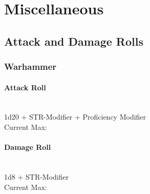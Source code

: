 {\section*{Miscellaneous}
\subsection*{Attack and Damage Rolls}
\subsubsection*{Warhammer}
\paragraph*{Attack Roll}\hfill\\
1d20 + STR-Modifier + Proficiency Modifier \\
\indent Current Max: 
\paragraph*{Damage Roll}\hfill\\
1d8 + STR-Modifier\\
\indent Current Max: \\
}